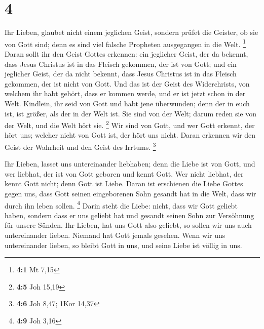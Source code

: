 \hypertarget{section-3}{%
\section{4}\label{section-3}}

 Ihr Lieben, glaubet nicht einem jeglichen Geist, sondern
prüfet die Geister, ob sie von Gott sind; denn es sind viel falsche
Propheten ausgegangen in die Welt. \footnote{\textbf{4:1} Mt 7,15}
 Daran sollt ihr den Geist Gottes erkennen: ein jeglicher
Geist, der da bekennt, dass Jesus Christus ist in das Fleisch gekommen,
der ist von Gott;  und ein jeglicher Geist, der da nicht
bekennt, dass Jesus Christus ist in das Fleisch gekommen, der ist nicht
von Gott. Und das ist der Geist des Widerchrists, von welchem ihr habt
gehört, dass er kommen werde, und er ist jetzt schon in der Welt.
 Kindlein, ihr seid von Gott und habt jene überwunden;
denn der in euch ist, ist größer, als der in der Welt ist.
 Sie sind von der Welt; darum reden sie von der Welt, und
die Welt hört sie. \footnote{\textbf{4:5} Joh 15,19}  Wir
sind von Gott, und wer Gott erkennt, der hört uns; welcher nicht von
Gott ist, der hört uns nicht. Daran erkennen wir den Geist der Wahrheit
und den Geist des Irrtums. \footnote{\textbf{4:6} Joh 8,47; 1Kor 14,37}

 Ihr Lieben, lasset uns untereinander liebhaben; denn die
Liebe ist von Gott, und wer liebhat, der ist von Gott geboren und kennt
Gott.  Wer nicht liebhat, der kennt Gott nicht; denn Gott
ist Liebe.  Daran ist erschienen die Liebe Gottes gegen
uns, dass Gott seinen eingeborenen Sohn gesandt hat in die Welt, dass
wir durch ihn leben sollen. \footnote{\textbf{4:9} Joh 3,16}
 Darin steht die Liebe: nicht, dass wir Gott geliebt
haben, sondern dass er uns geliebt hat und gesandt seinen Sohn zur
Versöhnung für unsere Sünden.  Ihr Lieben, hat uns Gott
also geliebt, so sollen wir uns auch untereinander lieben.
 Niemand hat Gott jemals gesehen. Wenn wir uns
untereinander lieben, so bleibt Gott in uns, und seine Liebe ist völlig
in uns.

